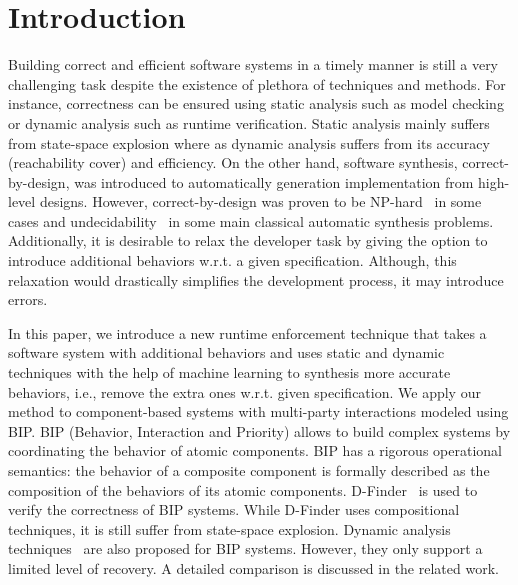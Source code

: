 \section{Introduction}
Building correct and efficient software systems in a timely manner is still a very challenging task despite the existence of plethora of techniques and methods. For instance, correctness can be ensured using static analysis such as model checking or dynamic analysis such as runtime verification. Static analysis mainly suffers from state-space explosion where as dynamic analysis suffers from its accuracy (reachability cover) and efficiency.  
%
On the other hand, software synthesis, correct-by-design, was introduced to automatically generation implementation from high-level designs. However, correct-by-design was proven to be NP-hard~\cite{PnueliR89} in some cases and undecidability~\cite{PnueliR90} in some main classical automatic synthesis problems. 
%
Additionally, it is desirable to relax the developer task by giving the option to introduce additional behaviors w.r.t. a given specification. Although, this relaxation would drastically simplifies the development process, it may introduce errors. 

%
In this paper, we introduce a new runtime enforcement technique that takes a software system with additional behaviors and uses static and dynamic techniques with the help of machine learning to synthesis more accurate behaviors, i.e., remove the extra ones w.r.t. given specification. 
%
We apply our method to component-based systems with multi-party interactions modeled using BIP. 
BIP (Behavior, Interaction and Priority) allows to build complex systems by coordinating the behavior of atomic components. BIP has a rigorous operational semantics: the behavior of a composite component is formally
described as the composition of the behaviors of its atomic components. D-Finder~\cite{BensalemBNS09} is used to verify the correctness of BIP systems. While D-Finder uses compositional techniques, it is still suffer from state-space explosion. Dynamic analysis techniques~\cite{FalconeJNBB15,CharafeddineEFJ15} are also proposed for BIP systems. However, they only support a limited level of recovery. A detailed comparison is discussed in the related work. 


